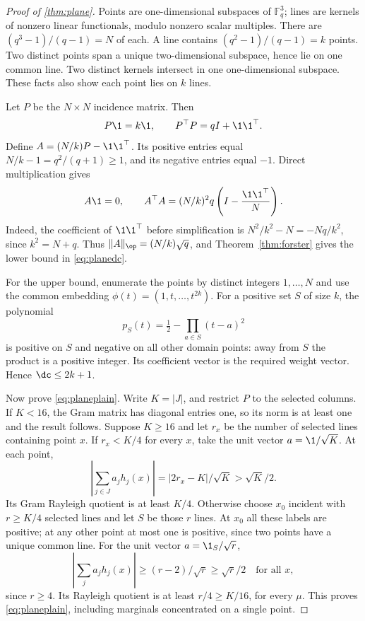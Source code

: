\begin{proof}[Proof of \cref{thm:plane}]
Points are one-dimensional subspaces of $\mathbb F_q^3$; lines are kernels of nonzero linear functionals, modulo nonzero scalar multiples. There are $(q^3-1)/(q-1)=N$ of each. A line contains $(q^2-1)/(q-1)=k$ points. Two distinct points span a unique two-dimensional subspace, hence lie on one common line. Two distinct kernels intersect in one one-dimensional subspace. These facts also show each point lies on $k$ lines.

Let $P$ be the $N\times N$ incidence matrix. Then
\[
 P\1=k\1,\qquad P^\top P=qI+\1\1^\top.
\]
Define $A=(N/k)P-\1\1^\top$. Its positive entries equal $N/k-1=q^2/(q+1)\geq1$, and its negative entries equal $-1$. Direct multiplication gives
\[
 A\1=0,\qquad
 A^\top A=(N/k)^2q\left(I-\frac{\1\1^\top}{N}\right).
\]
Indeed, the coefficient of $\1\1^\top$ before simplification is $N^2/k^2-N=-Nq/k^2$, since $k^2=N+q$. Thus $\|A\|_\op=(N/k)\sqrt q$, and Theorem~\ref{thm:forster} gives the lower bound in \eqref{eq:planedc}.

For the upper bound, enumerate the points by distinct integers $1,\ldots,N$ and use the common embedding
$\phi(t)=(1,t,\ldots,t^{2k})$. For a positive set $S$ of size $k$, the polynomial
\[
 p_S(t)=\tfrac12-\prod_{a\in S}(t-a)^2
\]
is positive on $S$ and negative on all other domain points: away from $S$ the product is a positive integer. Its coefficient vector is the required weight vector. Hence $\dc\leq2k+1$.

Now prove \eqref{eq:planeplain}. Write $K=|J|$, and restrict $P$ to the selected columns. If $K<16$, the Gram matrix has diagonal entries one, so its norm is at least one and the result follows. Suppose $K\geq16$ and let $r_x$ be the number of selected lines containing point $x$.
If $r_x<K/4$ for every $x$, take the unit vector $a=\1/\sqrt K$. At each point,
\[
 |\textstyle\sum_{j\in J}a_jh_j(x)|=|2r_x-K|/\sqrt K>\sqrt K/2.
\]
Its Gram Rayleigh quotient is at least $K/4$. Otherwise choose $x_0$ incident with $r\geq K/4$ selected lines and let $S$ be those $r$ lines. At $x_0$ all these labels are positive; at any other point at most one is positive, since two points have a unique common line. For the unit vector $a=\1_S/\sqrt r$,
\[
 |\textstyle\sum_j a_jh_j(x)|\geq(r-2)/\sqrt r\geq\sqrt r/2
 \quad\text{for all }x,
\]
since $r\geq4$. Its Rayleigh quotient is at least $r/4\geq K/16$, for every $\mu$. This proves \eqref{eq:planeplain}, including marginals concentrated on a single point.


\end{proof}
